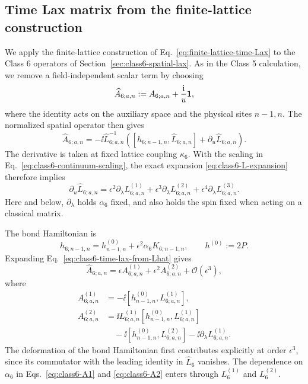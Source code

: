 \subsection{Time Lax matrix from the finite-lattice construction}
\label{sec:class6-time-lax}

We apply the finite-lattice construction of
Eq.~\eqref{eq:finite-lattice-time-Lax} to the Class 6 operators of
Section~\ref{sec:class6-spatial-lax}.  As in the Class 5 calculation, we
remove a field-independent scalar term by choosing
\begin{equation}
\widehat A_{6;a,n}
:=A_{6;a,n}+\frac{\mathrm{i}}{u}\mathbf{1},
\label{eq:class6-normalized-time-lax}
\end{equation}
where the identity acts on the auxiliary space and the physical sites
$n-1,n$.  The normalized spatial operator then gives
\begin{equation}
\widehat A_{6;a,n}
=-\ii\widehat L_{6;a,n}^{-1}
\left(
[h_{6;n-1,n},\widehat L_{6;a,n}]
+\partial_u\widehat L_{6;a,n}
\right).
\label{eq:class6-time-lax-from-Lhat}
\end{equation}
The derivative is taken at fixed lattice coupling $\kappa_6$.  With the
scaling in Eq.~\eqref{eq:class6-continuum-scaling}, the exact expansion
\eqref{eq:class6-L-expansion} therefore implies
\begin{equation}
\partial_u\widehat L_{6;a,n}
=\epsilon^2\partial_\lambda L^{(1)}_{6;a,n}
+\epsilon^3\partial_\lambda L^{(2)}_{6;a,n}
+\epsilon^4\partial_\lambda L^{(3)}_{6;a,n}.
\label{eq:class6-u-derivative-Lhat}
\end{equation}
Here and below, $\partial_\lambda$ holds $\alpha_6$ fixed, and also holds the
spin fixed when acting on a classical matrix.

The bond Hamiltonian is
\begin{equation}
h_{6;n-1,n}
=h^{(0)}_{n-1,n}+\epsilon^2\alpha_6K_{6;n-1,n},
\qquad h^{(0)}:=2P.
\label{eq:class6-h-expansion}
\end{equation}
Expanding Eq.~\eqref{eq:class6-time-lax-from-Lhat} gives
\begin{equation}
\widehat A_{6;a,n}
=\epsilon A^{(1)}_{6;a,n}
+\epsilon^2 A^{(2)}_{6;a,n}
+\mathcal O(\epsilon^3),
\label{eq:class6-A-expansion}
\end{equation}
where
\begin{align}
A^{(1)}_{6;a,n}
&=-\ii[h^{(0)}_{n-1,n},L^{(1)}_{6;a,n}],
\label{eq:class6-A1}\\
A^{(2)}_{6;a,n}
&=\ii L^{(1)}_{6;a,n}
[h^{(0)}_{n-1,n},L^{(1)}_{6;a,n}]
\nonumber\\
&\quad-\ii[h^{(0)}_{n-1,n},L^{(2)}_{6;a,n}]
-\ii\partial_\lambda L^{(1)}_{6;a,n}.
\label{eq:class6-A2}
\end{align}
The deformation of the bond Hamiltonian first contributes explicitly at
order $\epsilon^3$, since its commutator with the leading identity in
$\widehat L_6$ vanishes.  The dependence on $\alpha_6$ in
Eqs.~\eqref{eq:class6-A1} and \eqref{eq:class6-A2} enters through
$L_6^{(1)}$ and $L_6^{(2)}$.

